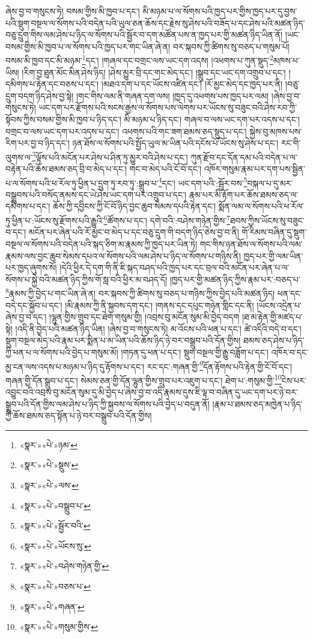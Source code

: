 ཞེས་བྱ་བ་གསུངས་ཏེ། བསམ་གྱིས་མི་ཁྱབ་པ་དང་། མི་མཉམ་པ་ལ་སོགས་པའི་ཁྱད་པར་གྱིས་ཁྱད་པར་དུ་བྱས་པའི་སྡུག་བསྔལ་ལ་སོགས་པའི་བདེན་པའི་ཡུལ་ཅན་ཆོས་དང་རྗེས་སུ་ཤེས་པའི་བཟོད་པ་དང་ཤེས་པའི་མཚན་ཉིད་བཅུ་དྲུག་གིས་ལམ་ཤེས་པ་ཉིད་ལ་སོགས་པའི་སྦྱོར་བ་དག་མཚོན་པས་ན་ཁྱད་པར་གྱི་མཚན་ཉིད་ཡིན་ནོ། །ཡང་བསམ་གྱིས་མི་ཁྱབ་པ་ལ་སོགས་པའི་ཁྱད་པར་གང་ཡིན་ཞེ་ན། བར་སྐབས་ཀྱི་ཚིགས་སུ་བཅད་པ་གསུམ་པོ། བསམ་མི་ཁྱབ་དང་མི་མཉམ་\footnote{«སྣར་»«པེ་»ཉམ་}དང་། །གཞལ་དང་བགྲང་ལས་ཡང་དག་འདས། །འཕགས་པ་ཀུན་སྡུད་\footnote{«སྣར་»«པེ་»སྡུས་}མཁས་པ་ཡིས། །རིག་བྱ་ཐུན་མོང་མིན་ཤེས་ཉིད། །ཤེས་མྱུར་བྲི་དང་གང་མེད་དང་། །སྒྲུབ་དང་ཡང་དག་འགྲུབ་པ་དང་། །དམིགས་པ་རྟེན་དང་བཅས་པ་དང་། །མཐའ་དག་པ་དང་ཡོངས་འཛིན་དང་། །རོ་མྱང་མེད་དང་ཁྱད་པར་ནི། །བཅུ་དྲུག་བདག་ཉིད་ཤེས་བྱ་སྟེ། །གང་གིས་ལམ་ནི་གཞན་དག་ལས། །ཁྱད་དུ་འཕགས་པས་ཁྱད་པར་ལམ། །ཞེས་བྱ་བ་གསུངས་ཏེ། ཡང་དག་པར་རྫོགས་པའི་སངས་རྒྱས་ལ་སོགས་པས་ལེགས་པར་ཡོངས་སུ་བཟུང་བའི་ཤེས་རབ་ཀྱི་སྟོབས་ཀྱིས་བསམ་གྱིས་མི་ཁྱབ་པ་ཉིད་དང་། མི་མཉམ་པ་ཉིད་དང་། གཞལ་བ་ལས་ཡང་དག་པར་འདས་པ་དང་། བགྲང་བ་ལས་ཡང་དག་པར་འདས་པ་དང་། འཕགས་པའི་གང་ཟག་ཐམས་ཅད་སྡུད་པ་དང་། སྐྱེས་བུ་མཁས་པས་རིག་པར་བྱ་བ་ཉིད་དང་། ཉན་ཐོས་ལ་སོགས་པའི་སྤྱོད་ཡུལ་མ་ཡིན་པའི་དངོས་པོ་ཡོངས་སུ་ཤེས་པ་དང་། རང་གི་ལུགས་ལ་\footnote{«སྣར་»«པེ་»ལས་}ལྟོས་པའི་མངོན་པར་ཤེས་པ་ཤིན་ཏུ་མྱུར་བའི་ཤེས་པ་དང་། ཀུན་རྫོབ་དང་དོན་དམ་པའི་བདེན་པ་ལ་བརྟེན་པའི་ཆོས་ཐམས་ཅད་བྲི་བ་མེད་པ་དང་། གང་བ་མེད་པའི་ངོ་བོ་དང་། འཁོར་གསུམ་རྣམ་པར་དག་པས་སྦྱིན་པ་ལ་སོགས་པའི་ཕ་རོལ་ཏུ་ཕྱིན་པ་དྲུག་ཏུ་རབ་ཏུ་:སྒྲུབ་པ་\footnote{«སྣར་»«པེ་»བསྒྲུབ་པ་}དང་། ཡང་དག་པའི་:སྦྱོར་བས་\footnote{«སྣར་»«པེ་»སྦྱོར་བའི་}བསྐལ་པ་དུ་མར་བསྒྲུབས་པའི་བསོད་ནམས་དང་ཡེ་ཤེས་ཡང་དག་པར་འགྲུབ་པ་དང་། རྣམ་པར་མི་རྟོག་པར་ཆོས་ཐམས་ཅད་ལ་དམིགས་པ་དང་། ཆོས་ཀྱི་དབྱིངས་ཀྱི་ངོ་བོ་ཉིད་བྱང་ཆུབ་སེམས་དཔའི་རྟེན་དང་། སྨོན་ལམ་ལ་སོགས་པའི་ཕ་རོལ་ཏུ་ཕྱིན་པ་:ཡོངས་སུ་རྫོགས་པའི་རྒྱུའི་\footnote{«སྣར་»«པེ་»ཡོངས་སུ་}ཚོགས་པ་དང་། དགེ་བའི་:བཤེས་གཉེན་གྱིས་\footnote{«སྣར་»«པེ་»བཤེས་གཉེན་གྱི་}ཐབས་ཀྱིས་ཡོངས་སུ་བཟུང་བ་དང་། མངོན་པར་ཞེན་པའི་རོ་མྱང་བ་མེད་པ་དང་བཅུ་དྲུག་གི་བདག་ཉིད་ཅེས་བྱ་བ་ནི། གོ་རིམས་བཞིན་དུ་སྡུག་བསྔལ་ལ་སོགས་པའི་བདེན་པའི་སྐད་ཅིག་མ་རྣམས་ཀྱི་ཁྱད་པར་ཡིན་ཏེ། གང་གིས་ཉན་ཐོས་ལ་སོགས་པའི་ལམ་རྣམས་ལས་བྱང་ཆུབ་སེམས་དཔའ་ལ་སོགས་པའི་ལམ་ཤེས་པ་ཉིད་ལ་སོགས་པ་གཉིས་ནི། ཁྱད་པར་གྱི་ལམ་ཡིན་པར་ཁྱད་ཞུགས་སོ། །དེའི་ཕྱིར་དེ་དག་གི་ནི་ཇི་སྐད་བཤད་པའི་ཁྱད་པར་དང་བྲལ་བའི་མངོན་པར་ཞེན་པ་ལ་སོགས་པ་སྐྱེ་བའི་མཚན་ཉིད་ཀྱིས་གོ་སླ་བའི་ཕྱིར་མ་བཤད་དོ། །ཁྱད་པར་གྱི་མཚན་ཉིད་ཀྱིས་རྣམ་པར་:བཅད་པ་\footnote{«སྣར་»«པེ་»བཅས་པ་}རྣམས་ཀྱི་བྱེད་པ་གང་ཡིན་ཞེ་ན། བར་སྐབས་ཀྱི་ཚིགས་སུ་བཅད་པ་གཉིས་ཀྱིས་བྱེད་པའི་མཚན་ཉིད། ཕན་དང་བདེ་དང་སྐྱོབ་པ་དང་། །མི་རྣམས་ཀྱི་ནི་སྐྱབས་དག་དང་། །གནས་དང་དཔུང་གཉེན་གླིང་དང་ནི། །ཡོངས་འདྲེན་པ་ཞེས་བྱ་བ་དང་། །ལྷུན་གྱིས་གྲུབ་དང་ཐེག་གསུམ་གྱི། །འབྲས་བུ་མངོན་སུམ་མི་བྱེད་བདག །ཐ་མ་རྟེན་གྱི་མཛད་པ་སྟེ། །འདི་ནི་བྱེད་པའི་མཚན་ཉིད་ཡིན། །ཞེས་བྱ་བ་གསུངས་ཏེ། མ་འོངས་པའི་ཕན་པ་དང་། ཚེ་འདིའི་བདེ་བ་དང་། སྡུག་བསྔལ་མེད་པའི་རྣམ་པར་སྨིན་པ་མ་ཡིན་པའི་ཆོས་ཉིད་ཉེ་བར་བསྒྲུབ་པའི་དོན་གྱིས། ཐམས་ཅད་ཤེས་པ་ཉིད་ཀྱི་ཕན་པ་ལ་སོགས་པའི་བྱེད་པ་གསུམ་མོ། །གཏན་དུ་ཕན་པ་དང་། སྡུག་བསྔལ་གྱི་རྒྱུ་བཟློག་པ་དང་། འཁོར་བ་དང་མྱ་ངན་ལས་འདས་པ་མཉམ་པ་ཉིད་དུ་རྟོགས་པ་དང་། རང་དང་:གཞན་གྱི་\footnote{«སྣར་»«པེ་»གཞན་}དོན་རྟོགས་པའི་རྟེན་གྱི་ངོ་བོ་དང་། གཞན་གྱི་དོན་སྒྲུབ་པ་དང་། སེམས་ཅན་གྱི་དོན་ལྷུན་གྱིས་གྲུབ་པར་འཇུག་པ་དང་། ཐེག་པ་:གསུམ་གྱི་\footnote{«སྣར་»«པེ་»གསུམ་གྱིས་}ངེས་པར་འབྱུང་བའི་འབྲས་བུ་མངོན་སུམ་དུ་མི་བྱེད་པ་ཞེས་བྱ་བ་འདི་རྣམས་དུས་ཇི་ལྟ་བ་བཞིན་དུ་ཡང་དག་པར་ཉེ་བར་སྒྲུབ་པའི་དོན་གྱིས་ལམ་ཤེས་པ་ཉིད་ཀྱི་སྐྱབས་ལ་སོགས་པའི་བྱེད་པ་བདུན་ནོ། །རྣམ་པ་ཐམས་ཅད་མཁྱེན་པ་ཉིད་ཀྱི་ཆོས་ཐམས་ཅད་སྟོན་པ་ཉེ་བར་བསྒྲུབ་པའི་དོན་གྱིས། 